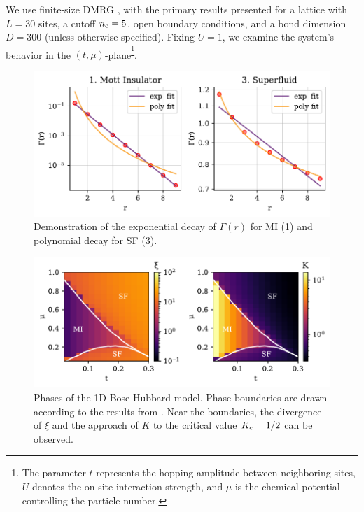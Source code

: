 We use finite-size DMRG \cite{catarina_density-matrix_2023, Fishman_2022}, with the primary results presented for a lattice with $L=30$ sites, a cutoff $n_{\textnormal{c}} = 5$, open boundary conditions, and a bond dimension $D=300$ (unless otherwise specified). Fixing $U=1$, we examine the system's behavior in the $(t, \mu)$-plane\textsuperscript{\footnote{
     The parameter $t$ represents the hopping amplitude between neighboring sites, $U$ denotes the on-site interaction strength, and $\mu$ is the chemical potential controlling the particle number.
}}.


\begin{figure}[t]
    \centering
    \includegraphics[width=\linewidth]{imgs/decay.pdf}
    \caption{Demonstration of the exponential decay of $\Gamma(r)$ for MI (1) and polynomial decay for SF (3).}
    \label{fig:decay}
\end{figure}


\begin{figure}[b]
    \centering
    \includegraphics[width=\linewidth]{imgs/phases2.pdf}
    \caption{Phases of the 1D Bose-Hubbard model. Phase boundaries are drawn according to the results from \cite{kuehner_phases_1998}. Near the boundaries, the divergence of $\xi$ and the approach of $K$ to the critical value $K_{\textnormal{c}}=1/2$ can be observed.}
    \label{fig:phases2}
\end{figure}





